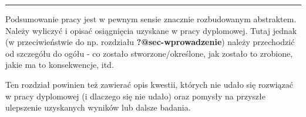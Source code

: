 \documentclass{amuthesis}
\begin{document}
\begin{center}\rule{0.5\linewidth}{0.5pt}\end{center}

Podsumowanie pracy jest w pewnym sensie znacznie rozbudowanym
abstraktem. Należy wyliczyć i opisać osiągnięcia uzyskane w pracy
dyplomowej. Tutaj jednak (w przeciwieństwie do np. rozdziału
\textbf{?@sec-wprowadzenie}) należy przechodzić od szczegółu do ogółu -
co zostało stworzone/określone, jak zostało to zrobione, jakie ma to
konsekwencje, itd.

Ten rozdział powinien też zawierać opis kwestii, których nie udało się
rozwiązać w pracy dyplomowej (i dlaczego się nie udało) oraz pomysły na
przyszłe ulepszenie uzyskanych wyników lub dalsze badania.

\printbibliography[heading=bibintoc, title=Bibliography]
\end{document}
